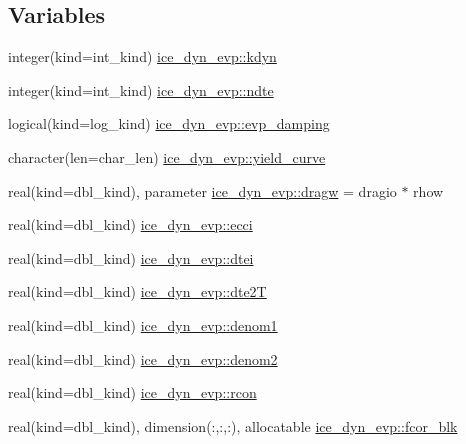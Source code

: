 \subsection*{Variables}
\begin{DoxyCompactItemize}
\item 
integer(kind=int\_\-kind) \hyperlink{namespaceice__dyn__evp_a53c5f7c9741c708ff3519f05aed59469}{ice\_\-dyn\_\-evp::kdyn}
\item 
integer(kind=int\_\-kind) \hyperlink{namespaceice__dyn__evp_a8eac575311a1794f1e0157b0f91c48e0}{ice\_\-dyn\_\-evp::ndte}
\item 
logical(kind=log\_\-kind) \hyperlink{namespaceice__dyn__evp_a79e497f85715426c0f09259d8fe336ed}{ice\_\-dyn\_\-evp::evp\_\-damping}
\item 
character(len=char\_\-len) \hyperlink{namespaceice__dyn__evp_a9dd00f965aaf1ddc6bd6921083e9abb1}{ice\_\-dyn\_\-evp::yield\_\-curve}
\item 
real(kind=dbl\_\-kind), parameter \hyperlink{namespaceice__dyn__evp_af77fabaa9bdeaa579c4f55bf5d6b2628}{ice\_\-dyn\_\-evp::dragw} = dragio $\ast$ rhow
\item 
real(kind=dbl\_\-kind) \hyperlink{namespaceice__dyn__evp_a74e9b0358ea08911b4d29dec60340f51}{ice\_\-dyn\_\-evp::ecci}
\item 
real(kind=dbl\_\-kind) \hyperlink{namespaceice__dyn__evp_a17c3a9aa810fbb29c6eda85ab2fb24dd}{ice\_\-dyn\_\-evp::dtei}
\item 
real(kind=dbl\_\-kind) \hyperlink{namespaceice__dyn__evp_a48f316b1e91781f36049db60d9d57d82}{ice\_\-dyn\_\-evp::dte2T}
\item 
real(kind=dbl\_\-kind) \hyperlink{namespaceice__dyn__evp_a485b3d193095e8d99aca4d1fc974ff56}{ice\_\-dyn\_\-evp::denom1}
\item 
real(kind=dbl\_\-kind) \hyperlink{namespaceice__dyn__evp_a7277e6c34976f4ccf320ab21b4d4f65f}{ice\_\-dyn\_\-evp::denom2}
\item 
real(kind=dbl\_\-kind) \hyperlink{namespaceice__dyn__evp_aa1005dc0bcfae1c38b0932bacec32121}{ice\_\-dyn\_\-evp::rcon}
\item 
real(kind=dbl\_\-kind), dimension(:,:,:), allocatable \hyperlink{namespaceice__dyn__evp_a1eeebacd4068f5555d3f66448b8acc64}{ice\_\-dyn\_\-evp::fcor\_\-blk}
\end{DoxyCompactItemize}
